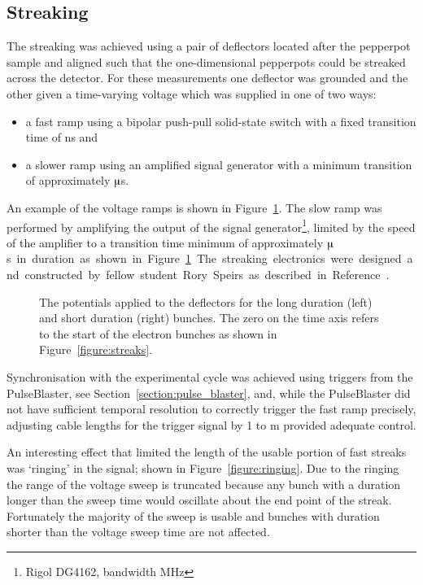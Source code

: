 \subsection{Streaking}
The streaking was achieved using a pair of deflectors located after the pepperpot sample and aligned such that the one-dimensional pepperpots could be streaked across the detector.
For these measurements one deflector was grounded and the other given a time-varying voltage which was supplied in one of two ways:
\begin{itemize}
\item a fast ramp using a bipolar push-pull solid-state switch with a fixed transition time of \unit[10]{ns} and
\item a slower ramp using an amplified signal generator with a minimum transition of approximately \unit[10]{$\muup$s}.
\end{itemize}
An example of the voltage ramps is shown in Figure~\ref{figure:deflector_voltages}.
The slow ramp was performed by amplifying the output of the signal generator\footnote{Rigol DG4162, bandwidth \unit[160]{MHz}}, limited by the speed of the amplifier to a transition time minimum of approximately \unit[10]{$\muup$s} in duration as shown in Figure~\ref{figure:deflector_voltages}.
The streaking electronics were designed and constructed by fellow student Rory Speirs as described in Reference~\cite{speirs_electron_2017}.

\begin{figure}
    \center
    
    \caption[Streak deflector potential.]{The potentials applied to the deflectors for the long duration (left) and short duration (right) bunches. The zero on the time axis refers to the start of the electron bunches as shown in Figure~\ref{figure:streaks}.}
    \label{figure:deflector_voltages}
\end{figure}

Synchronisation with the experimental cycle was achieved using triggers from the PulseBlaster, see Section~\ref{section:pulse_blaster}, and, while the PulseBlaster did not have sufficient temporal resolution to correctly trigger the fast ramp precisely, adjusting cable lengths for the trigger signal by 1 to \unit[2]{m} provided adequate control.

An interesting effect that limited the length of the usable portion of fast streaks was `ringing' in the signal; shown in Figure~\ref{figure:ringing}.
Due to the ringing the range of the voltage sweep is truncated because any bunch with a duration longer than the sweep time would oscillate about the end point of the streak.
Fortunately the majority of the sweep is usable and bunches with duration shorter than the voltage sweep time are not affected.


